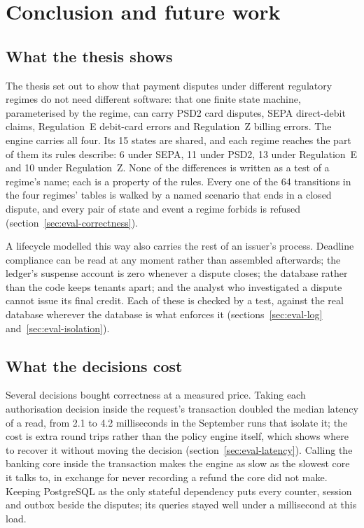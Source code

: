 \chapter{Conclusion and future work}
\label{ch:conclusion}


\section{What the thesis shows}
\label{sec:conclusion-shows}

The thesis set out to show that payment disputes under different regulatory regimes do not need different
software: that one finite state machine, parameterised by the regime, can carry PSD2 card disputes, SEPA
direct-debit claims, Regulation~E debit-card errors and Regulation~Z billing errors. The engine carries all four.
Its 15 states are shared, and each regime reaches the part of them its rules describe: 6 under SEPA, 11
under PSD2, 13 under Regulation~E and 10 under Regulation~Z. None of the differences is written as a test of
a regime's name; each is a property of the rules. Every one of the 64 transitions in the four regimes' tables is
walked by a named scenario that ends in a closed dispute, and every pair of state and event a regime forbids is
refused (section~\ref{sec:eval-correctness}).

A lifecycle modelled this way also carries the rest of an issuer's process. Deadline compliance can be read at any
moment rather than assembled afterwards; the ledger's suspense account is zero whenever a dispute closes; the
database rather than the code keeps tenants apart; and the analyst who investigated a dispute cannot issue its
final credit. Each of these is checked by a test, against the real database wherever the database is what
enforces it (sections~\ref{sec:eval-log} and~\ref{sec:eval-isolation}).

\section{What the decisions cost}
\label{sec:conclusion-costs}

Several decisions bought correctness at a measured price. Taking each authorisation decision inside the request's
transaction doubled the median latency of a read, from 2.1 to 4.2 milliseconds in the September runs that isolate it; the cost is extra
round trips rather than the policy engine itself, which shows where to recover it without moving the decision
(section~\ref{sec:eval-latency}). Calling the banking core inside the transaction makes the engine as slow as the
slowest core it talks to, in exchange for never recording a refund the core did not make. Keeping PostgreSQL as
the only stateful dependency puts every counter, session and outbox beside the disputes; its queries stayed well
under a millisecond at this load.

